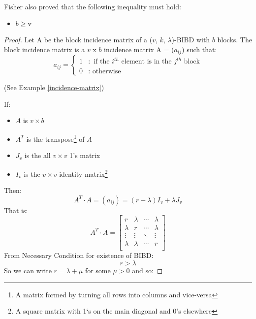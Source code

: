 \documentclass[12pt]{article}
\theoremstyle{definition}
\begin{document}
Fisher also proved that the following inequality must hold: 
\begin{itemize}
\item $b \geq $v
\end{itemize}
\begin{proof}
Let A be the block incidence matrix of a ($v$, $k$, $\lambda$)-BIBD with $b$ blocks. The block incidence matrix is a $v$ x $b$ incidence matrix A = ($a_{ij}$) such that:  
\begin{equation*}
a_{ij} = \begin{cases}
               1 & : \text{ if the } i^{th} \text { element is in the } j^{th} \text { block} \\
               0 & : \text{ otherwise}
           \end{cases}
\end{equation*}
\begin{center}
(See Example \ref{incidence-matrix})
\end{center}
If: 
\begin{itemize}
\item $A$ is $v\times{b}$
\item $A^T$ is the transpose\footnote{A matrix formed by turning all rows into columns and vice-versa} of $A$
\item $J_v$ is the all $v\times{v}$ 1's matrix
\item $I_v$ is the $v\times{v}$ identity matrix\footnote{A square matrix with 1`s on the main diagonal and 0's elsewhere}
\end{itemize}
Then: 
\begin{equation}
A^T \cdot A = \left({a_{ij}}\right) = \left({r - \lambda}\right) I_v + \lambda J_v
\end{equation} 
That is:
\begin{equation}
A^T \cdot A = \begin{bmatrix} 
r & \lambda & \cdots & \lambda \\
\lambda & r & \cdots & \lambda \\
\vdots & \vdots & \ddots & \vdots \\
\lambda & \lambda & \cdots & r \\
\end{bmatrix}
\end{equation}
From Necessary Condition for existence of BIBD\cite{necessaryBIBDCondition}:
\begin{equation*}
r > \lambda
\end{equation*}
So we can write $r = \lambda + \mu$ for some $\mu>0$ and so:

\end{proof}
\end{document}
